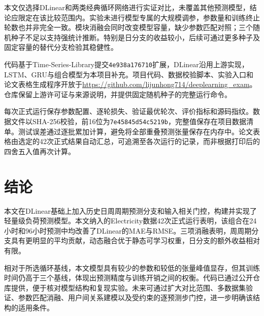 \documentclass[UTF8,a4paper,zihao=5,fontset=windows]{ctexart}
\begin{document}
本文仅选择DLinear和两类经典循环网络进行实证对比，未覆盖其他预测模型，结论应限定在该比较范围内。实验未进行模型专属的大规模调参，参数量和训练终止轮数也并非完全一致。模块消融会同时改变模型容量，缺少参数匹配对照；三个随机种子不足以支持强统计推断。特别是日分支的收益较小，后续可通过更多种子及固定容量的替代分支检验其稳健性。

代码基于Time-Series-Library提交\nolinkurl{4e938a176710}扩展，DLinear沿用上游实现，LSTM、GRU与组合模型为本项目补充。项目代码、数据校验脚本、实验入口和论文表格生成程序开放于\url{https://github.com/lijunhong714/deeplearning_exam}。仓库保留上游许可证与来源说明，并提供固定随机种子的完整运行命令。

每次正式运行保存参数配置、逐轮损失、验证最优轮次、评价指标和源码指纹。数据文件以SHA-256校验，前16位为\nolinkurl{7e45845d54c5219b}，完整值保存在项目数据清单。测试误差通过逐批累加计算，避免将全部重叠预测张量保存在内存中。论文表格由选定的42次正式结果自动汇总，可追溯至各次运行的记录，而非根据打印后的四舍五入值再次计算。

\section{结论}
本文在DLinear基础上加入历史日周周期预测分支和输入相关门控，构建并实现了轻量级负荷预测模型。本文纳入的Electricity数据42次正式运行表明，该组合在24小时和96小时预测中均改善了DLinear的MAE与RMSE。三项消融表明，周周期分支具有更明显的平均贡献，动态融合优于静态可学习权重，日分支的额外收益相对有限。

相对于所选循环基线，本文模型具有较少的参数和较低的张量峰值显存，但其训练时间仍高于三个基线，体现出预测精度与训练开销之间的权衡。代码已通过公开仓库提供，便于核对模型结构和复现实验。未来可通过扩大对比范围、多数据集验证、参数匹配消融、用户间关系建模以及受约束的逐预测步门控，进一步明确该结构的适用条件。



\end{document}
